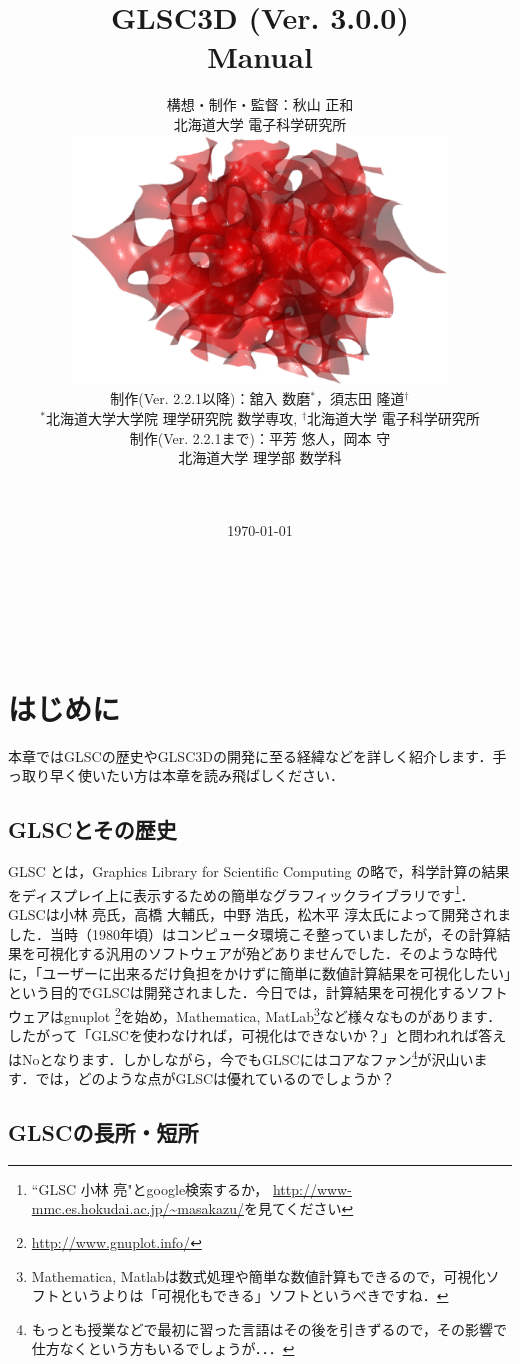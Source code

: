 \documentclass[platex,a4paper,12pt]{jsarticle}%
\title{\vspace{10mm}\Huge{GLSC3D (Ver. 3.0.0) \\ Manual}}
\author{\Large{構想・制作・監督：秋山 正和}\\\vspace{5mm}
北海道大学 電子科学研究所 \vspace{1zw} \\
\includegraphics[width=100mm]{Figures/eps/CoverPage.eps} \vspace{1zw} \\
\Large{制作(Ver. 2.2.1以降)：舘入 数磨$^*$，須志田 隆道$^\dagger$} \\
$^*$北海道大学大学院 理学研究院 数学専攻,  $^\dagger$北海道大学 電子科学研究所
\vspace{1zw}\\ 
\Large{制作(Ver. 2.2.1まで)：平芳 悠人，岡本 守} \\
北海道大学 理学部 数学科\\
\\
\\
\date{\today}
}
\begin{document}
\maketitle
\thispagestyle{empty}


\newpage
\thispagestyle{empty}
　
\newpage

\setcounter{tocdepth}{3}
\tableofcontents

\newpage
\thispagestyle{empty}
　
\newpage

\section{はじめに}

本章ではGLSCの歴史やGLSC3Dの開発に至る経緯などを詳しく紹介します．手っ取り早く使いたい方は本章を読み飛ばしください．

\subsection{GLSCとその歴史}

GLSC とは，Graphics Library for Scientific Computing の略で，科学計算の結果をディスプレイ上に表示するための簡単なグラフィックライブラリです\footnote{``GLSC 小林 亮"とgoogle検索するか，
\url{http://www-mmc.es.hokudai.ac.jp/~masakazu/}を見てください}．GLSCは小林 亮氏，高橋 大輔氏，中野 浩氏，松木平 淳太氏によって開発されました．当時（1980年頃）はコンピュータ環境こそ整っていましたが，その計算結果を可視化する汎用のソフトウェアが殆どありませんでした．そのような時代に，「ユーザーに出来るだけ負担をかけずに簡単に数値計算結果を可視化したい」という目的でGLSCは開発されました．今日では，計算結果を可視化するソフトウェアはgnuplot \footnote{\url{http://www.gnuplot.info/}}を始め，Mathematica, MatLab\footnote{Mathematica, Matlabは数式処理や簡単な数値計算もできるので，可視化ソフトというよりは「可視化もできる」ソフトというべきですね．}など様々なものがあります．したがって「GLSCを使わなければ，可視化はできないか？」と問われれば答えはNoとなります．しかしながら，今でもGLSCにはコアなファン\footnote{もっとも授業などで最初に習った言語はその後を引きずるので，その影響で仕方なくという方もいるでしょうが．．．}が沢山います．では，どのような点がGLSCは優れているのでしょうか？

\subsection{GLSCの長所・短所}
\end{document}
